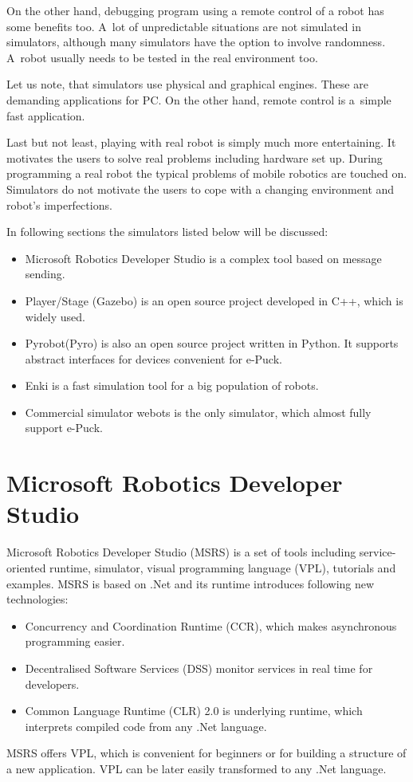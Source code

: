   On the other hand, debugging program using a remote control of a robot has some benefits too. 
  A~lot of unpredictable situations are not simulated in simulators, although 
  many simulators have the option to involve randomness. A~robot usually
  needs to be tested in the real environment too.
  
  Let us note, that simulators use physical and graphical engines. 
  These are demanding applications for PC. 
  On the other hand, remote control is a~simple fast application.
  
  Last but not least, playing with real robot is simply much more entertaining. 	
  It motivates the users to solve real problems including hardware set up. 
  During programming a real robot the typical problems of mobile robotics are touched on.
  Simulators do not motivate the users to cope with a changing environment and robot's imperfections.
  
  In following sections the simulators listed below will be discussed:
  \begin{itemize}
  \item Microsoft Robotics Developer Studio\cite{msrs} is a complex tool based on message sending.
  \item Player/Stage\cite{player} (Gazebo) is an open source project developed in C++, which is widely used.
  \item Pyrobot(Pyro)\cite{pyro} is also an open source project written in Python. It supports abstract
  interfaces for devices convenient for e-Puck.
  \item Enki\cite{enki} is a fast simulation tool for a big population of robots.
  \item Commercial simulator webots\cite{webots} is the only simulator, which almost fully support e-Puck. 
  \end{itemize}
\section{Microsoft Robotics Developer Studio\cite{msrs}} 
  Microsoft Robotics Developer Studio (MSRS) is a set of tools including service-oriented runtime,
  simulator, visual programming language (VPL),
  tutorials and examples. MSRS is based on .Net and its runtime introduces following new technologies:
  \begin{itemize}
  \item Concurrency and Coordination Runtime (CCR), which makes asynchronous programming easier.
  \item Decentralised Software Services (DSS) monitor services in real time for developers.
  \item Common Language Runtime (CLR) 2.0 is underlying runtime, 
          which interprets compiled code from any .Net language.
  \end{itemize}	
  MSRS offers VPL, which is convenient for beginners or for building a structure of a new application.
  VPL can be later easily transformed to any .Net language.
  

